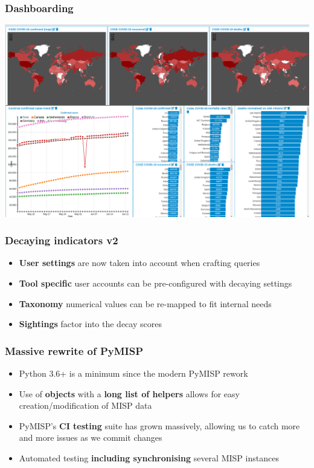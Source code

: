 \begin{frame}
\frametitle{Dashboarding}
\includegraphics[scale=0.25]{images/dashboard.png}
\end{frame}


\begin{frame}
\frametitle{Decaying indicators v2}
\begin{itemize}
	\item {\bf User settings} are now taken into account when crafting queries
        \item {\bf Tool specific} user accounts can be pre-configured with decaying settings
        \item {\bf Taxonomy} numerical values can be re-mapped to fit internal needs
        \item {\bf Sightings} factor into the decay scores
\end{itemize}
\end{frame}

\begin{frame}
\frametitle{Massive rewrite of PyMISP}
\begin{itemize}
	\item Python 3.6+ is a minimum since the modern PyMISP rework
        \item Use of {\bf objects} with a {\bf long list of helpers} allows for easy creation/modification of MISP data
        \item PyMISP's {\bf CI testing} suite has grown massively, allowing us to catch more and more issues as we commit changes
        \item Automated testing {\bf including synchronising} several MISP instances
\end{itemize}
\end{frame}

